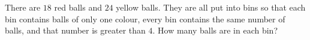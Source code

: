 There are $18$ red balls and $24$ yellow balls. They are all put into bins so that each bin contains balls of only one colour, every bin contains the same number of balls, and that number is greater than $4$. How many balls are in each bin?
